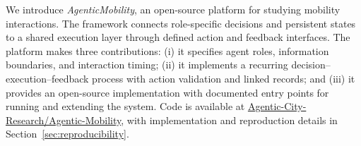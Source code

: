 

We introduce \emph{AgenticMobility}, an open-source platform for studying mobility interactions. The framework connects role-specific decisions and persistent states to a shared execution layer through defined action and feedback interfaces. 
The platform makes three contributions:
(i) it specifies agent roles, information boundaries,
and interaction timing;
(ii) it implements a recurring decision--execution--feedback
process with action validation and linked records; and
(iii) it provides an open-source implementation with
documented entry points for running and extending the system.
Code is available at \href{https://github.com/Agentic-City-Research/Agentic-Mobility}{Agentic-City-Research/Agentic-Mobility}, with implementation and reproduction details in Section~\ref{sec:reproducibility}.



